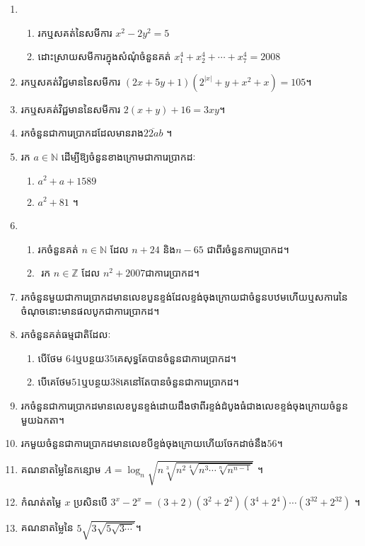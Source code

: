 \documentclass[a4paper,12pt]{book}
\newcommand{\N}{\mathbb{N}}
\newcommand{\Z}{\mathbb{Z}}
\begin{document}
\begin{enumerate}[1]
\begin{enumerate}[a]
\end{enumerate}
\item 
\begin{enumerate}[a]
\item រកឬសគត់នៃសមីការ $x^2-2y^2=5$
\item ដោះស្រាយសមីការក្នុងសំណុំចំនួនគត់ $x_1^4+x_2^4+\cdots+x_7^4=2008$
\end{enumerate}
\item រកឬសគត់វិជ្ជមាននៃសមីការ $\left(2x+5y+1\right)\left(2^{\vert x \vert}+y+x^2+x\right)=105$។
\item រកឬសគត់វិជ្ជមាននៃសមីការ $2\left(x+y\right)+16=3xy$​។
\item រកចំនួនជាការេប្រាកដដែលមានរាង​ $\overline{22ab}$ ។
\item រក $a\in {\N}$ ដើម្បីឱ្យចំនួនខាងក្រោមជាការេប្រាកដៈ
\begin{enumerate}[a]
\item $a^2+a+1589$
\item $a^2+81$ ។
\end{enumerate}
\item 
\begin{enumerate}[a]
\item រកចំនួនគត់ $n\in {\N}$ ដែល $n+24$ និង​ $n-65$ ជាពីរចំនួនការេប្រាកដ។
\item​ រក $n\in {\Z}$ ដែល $n^2+2007$​ ជាការេប្រាកដ។
\end{enumerate}
\item រកចំនួនមួយជាការេប្រាកដមានលេខបួនខ្ទង់ដែលខ្ទង់ចុងក្រោយជាចំនួនបឋម​ ហើយឬសការេនៃចំណុចនោះមានផលបូកជាការេប្រាកដ។
\item រកចំនួនគត់ធម្មជាតិដែលៈ
\begin{enumerate}[a]
\item បើថែម $64$ឬបន្ថយ$35$គេសុទ្ធតែបានចំនួនជាការេប្រាកដ។
\item បើគេថែម$51$ឬបន្ថយ$38$គេនៅតែបានចំនួនជាការេប្រាកដ។
\end{enumerate}
\item រកចំនួនជាការេប្រាកដមានលេខបួនខ្ទង់ដោយដឹងថាពីរខ្ទង់ដំបូងធំជាងលេខខ្ទង់ចុងក្រោយចំនួនមួយឯកតា។
\item​ រកមួយចំនួនជាការេប្រាកដមានលេខបីខ្ទង់ចុងក្រោយហើយចែកដាច់នឹង$56$។
\item គណនាតម្លៃនៃកន្សោម $A=\log_n \sqrt{n \sqrt[3]{n^2\sqrt[4]{n^3\cdots \sqrt[n]{n^{n-1}}}}}$ ។
\item កំណត់តម្លៃ $x$ ប្រសិនបើ $3^x-2^x=\left(3+2\right)\left(3^2+2^2\right)\left(3^4+2^4\right)\cdots \left(3^{32}+2^{32}\right)$ ។
\item គណនាតម្លៃនៃ $5\sqrt{3\sqrt{5\sqrt{3\cdots}}}$។

\end{enumerate}
\end{document}

